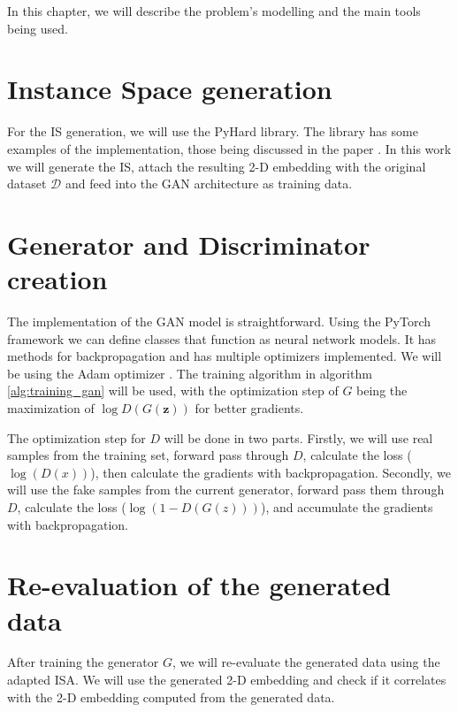 In this chapter, we will describe the problem's modelling and the main tools being used.

\section{Instance Space generation}

For the IS generation, we will use the PyHard \cite{Lorena2022} library. The library has some examples of the implementation, those being discussed in the paper \cite{Lorena2022}. In this work we will generate the IS, attach the resulting 2-D embedding with the original dataset $\mathcal{D}$ and feed into the GAN architecture as training data.

\section{Generator and Discriminator creation}

The implementation of the GAN model is straightforward. Using the PyTorch \cite{paszke2019pytorch} framework we can define classes that function as neural network models. It has methods for backpropagation and has multiple optimizers implemented. We will be using the Adam optimizer \cite{kingma2017adam}. The training algorithm in algorithm \ref{alg:training_gan} will be used, with the optimization step of $G$ being the maximization of $\log D\left( G\left( \mathbf{z} \right) \right)$ for better gradients. 

The optimization step for $D$ will be done in two parts. Firstly, we will use real samples from the training set, forward pass through $D$, calculate the loss ($\log(D(x))$), then calculate the gradients with backpropagation. Secondly, we will use the fake samples from the current generator, forward pass them through $D$, calculate the loss ($\log(1-D(G(z)))$), and accumulate the gradients with backpropagation.

\section{Re-evaluation of the generated data}

After training the generator $G$, we will re-evaluate the generated data using the adapted ISA. We will use the generated 2-D embedding and check if it correlates with the 2-D embedding computed from the generated data.